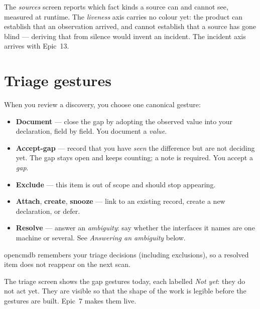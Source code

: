 \documentclass[11pt,oneside,listof=totoc,bibliography=totoc]{scrreprt}
\begin{document}
\begin{planned}
The \emph{sources} screen reports which fact kinds a source can and cannot see, measured at
runtime. The \emph{liveness} axis carries no colour yet: the product can establish that an
observation arrived, and cannot establish that a source has gone blind --- deriving that from
silence would invent an incident. The incident axis arrives with Epic~13.
\end{planned}

\section{Triage gestures}
When you review a discovery, you choose one canonical gesture:
\begin{itemize}
  \item \textbf{Document} — close the gap by adopting the observed value into your
        declaration, field by field. You document a \emph{value}.
  \item \textbf{Accept-gap} — record that you have \emph{seen} the difference but are not
        deciding yet. The gap stays open and keeps counting; a note is required. You accept a
        \emph{gap}.
  \item \textbf{Exclude} — this item is out of scope and should stop appearing.
  \item \textbf{Attach}, \textbf{create}, \textbf{snooze} — link to an existing record,
        create a new declaration, or defer.
  \item \textbf{Resolve} — answer an \emph{ambiguity}: say whether the interfaces it names
        are one machine or several. See \emph{Answering an ambiguity} below.
\end{itemize}

\begin{note}
opencmdb remembers your triage decisions (including exclusions), so a resolved item does not
reappear on the next scan.
\end{note}

\begin{planned}
The triage screen shows the gap gestures today, each labelled \emph{Not yet}: they do not
act yet. They are visible so that the shape of the work is legible before the gestures are
built. Epic~7 makes them live.
\end{planned}
\end{document}
